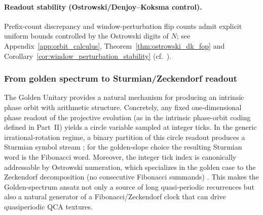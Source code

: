 \paragraph{Readout stability (Ostrowski/Denjoy--Koksma control).}
Prefix-count discrepancy and window-perturbation flip counts admit explicit uniform bounds controlled by the Ostrowski digits of $N$; see Appendix~\ref{app:orbit_calculus}, Theorem~\ref{thm:ostrowski_dk_fop} and Corollary~\ref{cor:window_perturbation_stability} (cf.\ \cite{Ma2025HPA}).\par

\subsubsection{From golden spectrum to Sturmian/Zeckendorf readout}
The Golden Unitary provides a natural mechanism for producing an intrinsic phase orbit with arithmetic structure. Concretely, any fixed one-dimensional phase readout of the projective evolution (as in the intrinsic phase-orbit coding defined in Part~II) yields a circle variable sampled at integer ticks. In the generic irrational-rotation regime, a binary partition of this circle readout produces a Sturmian symbol stream \cite{MorseHedlund1940,Lothaire2002}; for the golden-slope choice the resulting Sturmian word is the Fibonacci word. Moreover, the integer tick index is canonically addressable by Ostrowski numeration, which specializes in the golden case to the Zeckendorf decomposition (no consecutive Fibonacci summands) \cite{Zeckendorf1972,AlloucheShallit2003}. This makes the Golden-spectrum ansatz not only a source of long quasi-periodic recurrences but also a natural generator of a Fibonacci/Zeckendorf clock that can drive quasiperiodic QCA textures.

